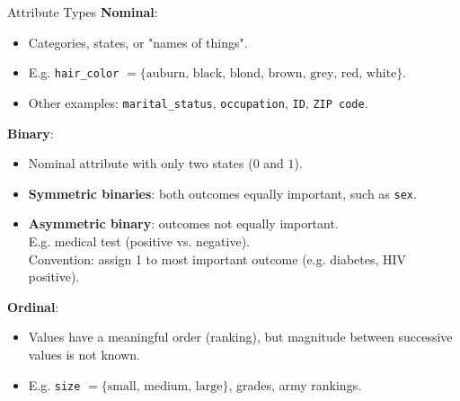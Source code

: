 \begin{frame}{Attribute Types}
	\textbf{Nominal}:
	\begin{itemize}
		\item Categories, states, or "names of things".
		\item E.g. \texttt{hair\_color} $= \{\text{auburn, black, blond, brown, grey, red, white}\}$.
		\item Other examples: \texttt{marital\_status}, \texttt{occupation}, \texttt{ID}, \texttt{ZIP code}.
	\end{itemize}

	\textbf{Binary}:
	\begin{itemize}
		\item Nominal attribute with only two states ($0$ and $1$).
		\item \textbf{Symmetric binaries}: both outcomes equally important, such as \texttt{sex}.
		\item \textbf{Asymmetric binary}: outcomes not equally important. \\
		      E.g. medical test (positive vs. negative).\\
		      Convention: assign 1 to most important outcome (e.g. diabetes, HIV positive).
	\end{itemize}

	\textbf{Ordinal}:
	\begin{itemize}
		\item Values have a meaningful order (ranking), but magnitude between
		      successive values is not known.
		\item E.g. \texttt{size} $= \{\text{small, medium, large}\}$, grades, army rankings.
	\end{itemize}
\end{frame}


